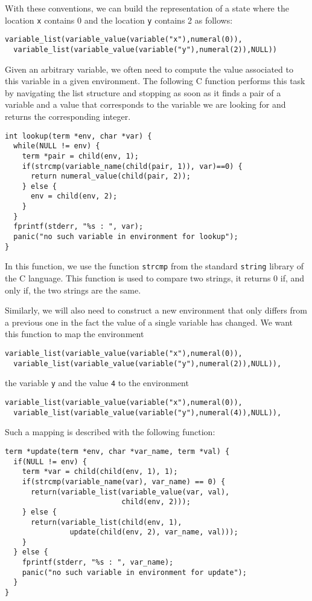 \documentclass{book}
\begin{document}
With these conventions, we can build the representation of a state where
the location {\tt x} contains 0 and the location {\tt y} contains 2 as
follows:
\begin{verbatim}
variable_list(variable_value(variable("x"),numeral(0)),
  variable_list(variable_value(variable("y"),numeral(2)),NULL))
\end{verbatim}

Given an arbitrary variable, we often need to compute the value
associated to this variable in a given environment.  The following
C function performs this task by navigating the list structure and
stopping as soon as it finds a pair of a variable and a value that
corresponds to the variable we are looking for and returns the
corresponding integer.
\begin{verbatim}
int lookup(term *env, char *var) {
  while(NULL != env) {
    term *pair = child(env, 1);
    if(strcmp(variable_name(child(pair, 1)), var)==0) {
      return numeral_value(child(pair, 2));
    } else {
      env = child(env, 2);
    }
  }
  fprintf(stderr, "%s : ", var);
  panic("no such variable in environment for lookup");
}
\end{verbatim}
In this function, we use the function {\tt strcmp} from the
standard {\tt string} library of the C language.  This function
is used to compare two strings, it returns 0 if, and only if, the two
strings are the same.

Similarly, we will also need to construct a new environment that
only differs from a previous one in the fact the value of a single
variable has changed.  We want this function to map the environment
\begin{verbatim}
variable_list(variable_value(variable("x"),numeral(0)),
  variable_list(variable_value(variable("y"),numeral(2)),NULL)),
\end{verbatim}
the variable {\tt y} and the value {\tt 4} to the environment
\begin{verbatim}
variable_list(variable_value(variable("x"),numeral(0)),
  variable_list(variable_value(variable("y"),numeral(4)),NULL)),
\end{verbatim}


Such a mapping is described with the following function:
\begin{verbatim}
term *update(term *env, char *var_name, term *val) {
  if(NULL != env) {
    term *var = child(child(env, 1), 1);
    if(strcmp(variable_name(var), var_name) == 0) {
      return(variable_list(variable_value(var, val),
                           child(env, 2)));
    } else {
      return(variable_list(child(env, 1), 
			   update(child(env, 2), var_name, val)));
    }
  } else {
    fprintf(stderr, "%s : ", var_name);
    panic("no such variable in environment for update");
  }
}
\end{verbatim}
\end{document}
